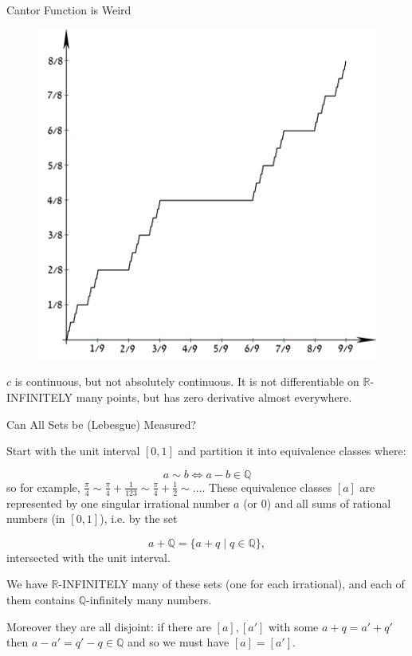 \documentclass[9pt]{beamer}
\begin{document}
    \begin{frame}{Cantor Function is Weird}

        \begin{figure}

            \begin{center}

                \includegraphics[width=0.6\linewidth]{CantorEscalier-2.png}

            \end{center}
            
        \end{figure}

        $c$ is continuous, but not absolutely continuous.
        It is not differentiable on $\mathbb{R}$-INFINITELY many points, but has zero derivative almost everywhere.
        
    \end{frame}

\begin{frame}{Can All Sets be (Lebesgue) Measured?}

        Start with the unit interval $[0, 1]$ and partition it into equivalence classes where:

        \[a\sim b\Leftrightarrow a-b\in\mathbb{Q}\]
        so for example, $\frac{\pi}{4}\sim\frac{\pi}{4}+\frac{1}{123}\sim\frac{\pi}{4}+\frac{1}{2}\sim\dots$. \pause
        These equivalence classes $[a]$ are represented by one singular irrational number $a$ (or $0$) and all sums of rational numbers (in $[0, 1]$), i.e. by the set

        \[a+\mathbb{Q}=\{a+q\;|\;q\in\mathbb{Q}\},\]
        intersected with the unit interval.

        \pause

        \vspace{24pt}
        
        We have $\mathbb{R}$-INFINITELY many of these sets (one for each irrational), and each of them contains $\mathbb{Q}$-infinitely many numbers.

        \pause

        \vspace{24pt}
        
        Moreover they are all disjoint: if there are $[a], [a']$ with some $a+q=a'+q'$ then $a-a'=q'-q\in\mathbb{Q}$ and so we must have $[a]=[a']$.
        
    \end{frame}
\end{document}
